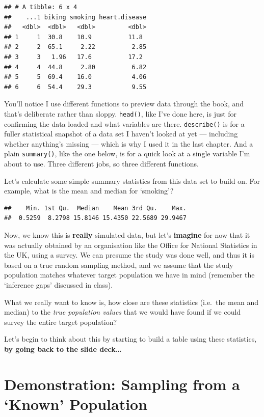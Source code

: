 \documentclass[
]{book}
\begin{document}
\begin{verbatim}
## # A tibble: 6 x 4
##    ...1 biking smoking heart.disease
##   <dbl>  <dbl>   <dbl>         <dbl>
## 1     1  30.8    10.9          11.8 
## 2     2  65.1     2.22          2.85
## 3     3   1.96   17.6          17.2 
## 4     4  44.8     2.80          6.82
## 5     5  69.4    16.0           4.06
## 6     6  54.4    29.3           9.55
\end{verbatim}

You'll notice I use different functions to preview data through the book, and that's deliberate rather than sloppy. \texttt{head()}, like I've done here, is just for confirming the data loaded and what variables are there. \texttt{describe()} is for a fuller statistical snapshot of a data set I haven't looked at yet --- including whether anything's missing --- which is why I used it in the last chapter. And a plain \texttt{summary()}, like the one below, is for a quick look at a single variable I'm about to use. Three different jobs, so three different functions.

Let's calculate some simple summary statistics from this data set to build on. For example, what is the mean and median for `smoking'?

\begin{verbatim}
##    Min. 1st Qu.  Median    Mean 3rd Qu.    Max. 
##  0.5259  8.2798 15.8146 15.4350 22.5689 29.9467
\end{verbatim}

Now, we know this is \textbf{really} simulated data, but let's \textbf{imagine} for now that it was actually obtained by an organisation like the Office for National Statistics in the UK, using a survey. We can presume the study was done well, and thus it is based on a true random sampling method, and we assume that the study population matches whatever target population we have in mind (remember the `inference gaps' discussed in class).

What we really want to know is, how close are these statistics (i.e.~the mean and median) to the \emph{true population values} that we would have found if we could survey the entire target population?

Let's begin to think about this by starting to build a table using these statistics, \textbf{by going back to the slide deck\ldots{}}

\section{Demonstration: Sampling from a `Known' Population}\label{demonstration-sampling-from-a-known-population}
\end{document}
